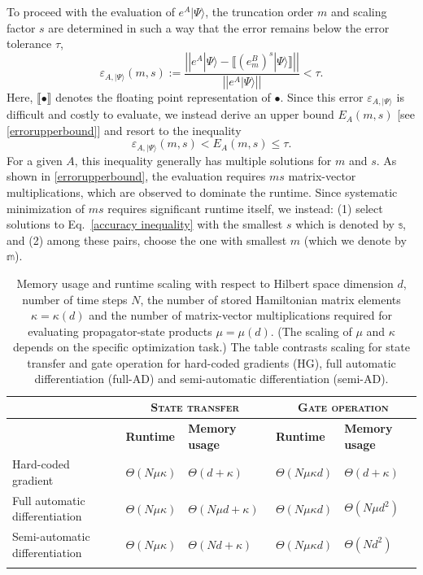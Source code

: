 \documentclass[letterpaper,10pt]{iopart}
\newcommand{\dket}[1]{|#1\rangle}
\newcommand{\norm}[1]{\left|\left|#1\right|\right|}
\begin{document}
To proceed with the evaluation of $e^A\dket{\Psi}$, the truncation order $m$ and scaling factor $s$ are determined in such a way that the error remains below the error tolerance $\tau$, 
\begin{equation}
\label{error defnition}
    \varepsilon_{A,\dket{\Psi}}(m,s) := \frac{\norm{e^A\dket{\Psi}-\llbracket (e^B_m)^s\dket{\Psi}\rrbracket}}{\norm{e^A\dket{\Psi}}}< \tau .
\end{equation}
Here, $\llbracket \bullet{}  \rrbracket$ denotes the floating point representation of $\bullet$. Since this error $\varepsilon_{A,\dket{\Psi}}$ is difficult and costly to evaluate, we instead derive an upper bound $E_A(m,s)$ [see \ref{errorupperbound}] and resort to the inequality 
\begin{equation}
\label{accuracy inequality}
    \varepsilon_{A,\dket{\Psi}}(m,s)<E_A(m,s)\leq \tau.
\end{equation}
For a given $A$, this inequality generally has multiple solutions for $m$ and $s$. As shown in  \ref{errorupperbound}, the evaluation requires $ms$ matrix-vector multiplications, which are observed to dominate the runtime. Since systematic minimization of $ms$ requires significant runtime itself, we instead: (1) select solutions to Eq.\ \eqref{accuracy inequality} with the smallest $s$ which is denoted by $\mathbb{s}$, and (2) among these pairs, choose the one with smallest $m$ (which we denote by $\mathbb{m}$). 
\begin{table}[ht]
\renewcommand{\arraystretch}{1.5}
\centering %
\caption{Memory usage and runtime scaling with respect to Hilbert space dimension $d$, number of time steps $N$,  the number of stored Hamiltonian matrix elements $\kappa=\kappa(d)$ and the number of matrix-vector multiplications required for evaluating propagator-state products $\mu=\mu(d)$. (The scaling of $\mu$ and $\kappa$ depends on the specific optimization task.) The table contrasts scaling for state transfer and gate operation for hard-coded gradients (HG), full automatic differentiation (full-AD) and semi-automatic differentiation (semi-AD). } %
\begin{tabular}
{p{}p{}p{}p{}p{}} 
\hline
\hline
& \multicolumn{2}{c}{\textbf{\textsc{State transfer}}} & \multicolumn{2}{c}{\textbf{\textsc{Gate operation}}}\\
\hline 
& \textbf{Runtime} & \textbf{Memory usage} & \textbf{Runtime} & \textbf{Memory usage}
\\
\hline
Hard-coded gradient & $\Theta(N\mu \kappa)$ & $\Theta(d+\kappa)$ & $\Theta(N\mu \kappa d)$ & $\Theta(d+\kappa)$\\ 
Full automatic differentiation & $\Theta(N\mu \kappa)$ & $\Theta(N\mu d+\kappa)$ & $\Theta(N\mu \kappa d)$ & $\Theta(N\mu d^2)$  \\
Semi-automatic differentiation & $\Theta(N\mu \kappa)$ & $\Theta(Nd+\kappa)$ & $\Theta(N\mu \kappa d)$ & $\Theta(Nd^2)$\\ 
\hline \hline
\label{scalingtable}
\end{tabular} 
\label{tablescaling}
\end{table}
\end{document}
